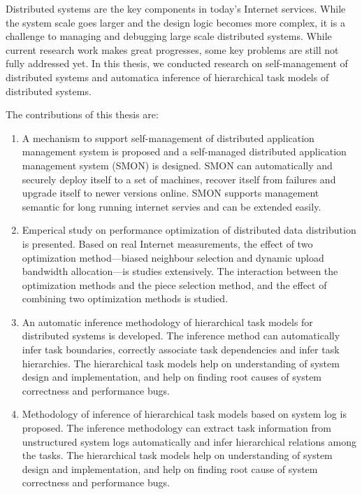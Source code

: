 \begin{eabstract}
  Distributed systems are the key components in today's Internet
  services. While the system scale goes larger and the design
  logic becomes more complex, it is a challenge to managing and
  debugging large scale distributed systems. While current research
  work makes great progresses, some key problems are still not fully
  addressed yet. In this thesis, we conducted research on
  self-management of distributed systems and automatica inference
  of hierarchical task models of distributed systems.

  The contributions of this thesis are:

  \begin{enumerate}

    \item A mechanism to support self-management of distributed
    application management system is proposed and a self-managed
    distributed application management system (SMON) is designed. SMON
    can automatically and securely deploy itself to a set of machines,
    recover itself from failures and upgrade itself to newer versions
    online. SMON supports management semantic for long running
    internet servies and can be extended easily.

    \item Emperical study on performance optimization of distributed
    data distribution is presented. Based on real Internet
    measurements, the effect of two optimization method---biased
    neighbour selection and dynamic upload bandwidth allocation---is
    studies extensively. The interaction between the optimization
    methods and the piece selection method, and the effect of
    combining two optimization methods is studied.

    \item An automatic inference methodology of hierarchical task
    models for distributed systems is developed. The inference method
    can automatically infer task boundaries, correctly associate task
    dependencies and infer task hierarchies.  The hierarchical task
    models help on understanding of system design and implementation,
    and help on finding root causes of system correctness and
    performance bugs.

    \item Methodology of inference of hierarchical task models based
    on system log is proposed. The inference methodology can extract
    task information from unstructured system logs automatically and
    infer hierarchical relations among the tasks. The hierarchical
    task models help on understanding of system design and
    implementation, and help on finding root cause of system
    correctness and performance bugs.

  \end{enumerate}

\end{eabstract}

